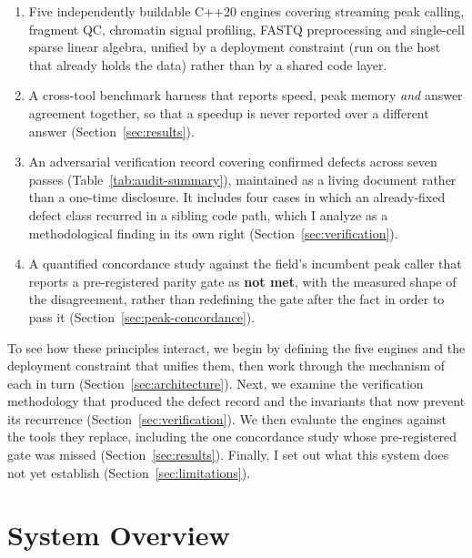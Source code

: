 \documentclass[10pt,twocolumn]{article}
\begin{document}
\begin{enumerate}\itemsep2pt
\item Five independently buildable C++20 engines covering streaming peak
  calling, fragment QC, chromatin signal profiling, FASTQ preprocessing and
  single-cell sparse linear algebra, unified by a deployment constraint (run
  on the host that already holds the data) rather than by a shared code
  layer.
\item A cross-tool benchmark harness that reports speed, peak memory
  \emph{and} answer agreement together, so that a speedup is never reported
  over a different answer (Section~\ref{sec:results}).
\item An adversarial verification record covering \NumAuditTotal{} confirmed
  defects across seven passes (Table~\ref{tab:audit-summary}), maintained as
  a living document rather than a one-time disclosure. It includes four cases
  in which an already-fixed defect class recurred in a sibling code path,
  which I analyze as a methodological finding in its own right
  (Section~\ref{sec:verification}).
\item A quantified concordance study against the field's incumbent peak
  caller that reports a pre-registered parity gate as \textbf{not met}, with
  the measured shape of the disagreement, rather than redefining the gate
  after the fact in order to pass it (Section~\ref{sec:peak-concordance}).
\end{enumerate}

To see how these principles interact, we begin by defining the five engines
and the deployment constraint that unifies them, then work through the
mechanism of each in turn (Section~\ref{sec:architecture}). Next, we examine
the verification methodology that produced the defect record and the
invariants that now prevent its recurrence (Section~\ref{sec:verification}).
We then evaluate the engines against the tools they replace, including the
one concordance study whose pre-registered gate was missed
(Section~\ref{sec:results}). Finally, I set out what this system does not yet
establish (Section~\ref{sec:limitations}).

\section{System Overview}
\end{document}
